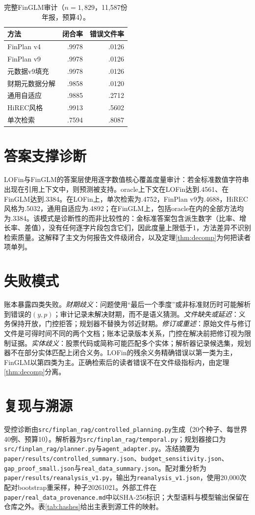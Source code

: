 \documentclass[10.5pt,a4paper]{ctexart}
\begin{document}
\begin{table}[H]\centering\small
\caption{完整FinGLM审计（$n=1{,}829$，11{,}587份年报，预算4）。}
\label{tab:finglm_full}
\begin{tabular}{lrr}
\toprule
方法 & 闭合率 & 错误文件率\\
\midrule
FinPlan v4 & .9978 & .0126\\
FinPlan v9 & .9978 & .0126\\
元数据v9填充 & .9978 & .0126\\
财期元数据分解 & .9858 & .0120\\
通用自适应 & .9885 & .2712\\
HiREC风格 & .9913 & .5602\\
单次检索 & .7594 & .8087\\
\bottomrule
\end{tabular}
\end{table}

\section{答案支撑诊断}
\label{app:answer}
LOFin与FinGLM的答案层使用逐字数值核心覆盖度量审计：若金标准数值字符串出现在引用上下文中，则预测被支持。oracle上下文在LOFin达到.4561、在FinGLM达到.3384。在LOFin上，单次检索为.4752，FinPlan v9为.4688，HiREC风格为.5032，通用自适应为.4892；在FinGLM上，包括oracle在内的全部方法均为.3384。该模式是诊断性的而非比较性的：金标准答案包含派生数字（比率、增长率、差值），没有任何逐字片段包含它们，因此度量上限低于1，方法差异不识别检索质量。这解释了主文为何报告文件级闭合，以及定理\ref{thm:decomp}为何把读者项单列。

\section{失败模式}
\label{app:failure}
账本暴露四类失败。\emph{财期歧义}：问题使用“最后一个季度”或非标准财历时可能解析到错误的$(y,p)$；审计记录未解决财期，而不是语义猜测。\emph{文件缺失或延迟}：义务保持开放，门控拒答；规划器不替换为邻近财期。\emph{修订或重述}：原始文件与修订文件是可得时间不同的两个文档；账本记录版本关系，门控在解决前把修订视为限制证据。\emph{实体歧义}：股票代码或简称可能匹配多个实体；解析器记录候选集，规划器不在部分实体匹配上闭合义务。LOFin的残余义务精确错误以第一类为主，FinGLM以第四类为主。正确检索后的读者错误不在文件级指标内，由定理\ref{thm:decomp}分离。

\section{复现与溯源}
\label{app:repro}
受控诊断由\texttt{src/finplan\_rag/controlled\_planning.py}生成（20个种子、每世界40例、预算10）。解析器为\texttt{src/finplan\_rag/temporal.py}；规划器接口为\texttt{src/finplan\_rag/planner.py}与\texttt{agent\_adapter.py}。冻结摘要为\texttt{paper/results/controlled\_summary.json}、\texttt{budget\_sensitivity.json}、\texttt{gap\_proof\_small.json}与\texttt{real\_data\_summary.json}。配对重分析为\texttt{paper/results/reanalysis\_v1.py}，输出为\texttt{reanalysis\_v1.json}，使用20{,}000次配对bootstrap重采样，种子20261021。外部工件在\texttt{paper/real\_data\_provenance.md}中以SHA-256标识；大型语料与模型输出保留在仓库之外。表\ref{tab:hashes}给出主表到源工件的映射。
\end{document}
